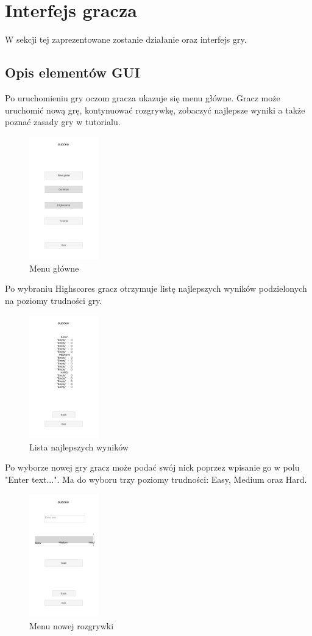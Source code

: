 \documentclass[a4paper, 11pt]{article}
\begin{document}
\section{Interfejs gracza}
W sekcji tej zaprezentowane zostanie działanie oraz interfejs gry.
\subsection{Opis elementów GUI}
Po uruchomieniu gry oczom gracza ukazuje się menu główne. Gracz może uruchomić nową grę, kontynuować rozgrywkę, zobaczyć najlepsze wyniki a także poznać zasady gry w tutorialu.
\begin{figure}[H]
	\centering
	\includegraphics[width=3cm]{zrzuty/1.png}
	\caption{Menu główne}
	\label{fig:menu}
\end{figure}
Po wybraniu Highscores gracz otrzymuje listę najlepszych wyników podzielonych na poziomy trudności gry.
\begin{figure}[H]
	\centering
	\includegraphics[width=3cm]{zrzuty/12.png}
	\caption{Lista najlepszych wyników}
	\label{fig:highscores}
\end{figure}
Po wyborze nowej gry gracz może podać swój nick poprzez wpisanie go w polu "Enter text...". Ma do wyboru trzy poziomy trudności: Easy, Medium oraz Hard.
\begin{figure}[H]
	\centering
	\includegraphics[width=3cm]{zrzuty/2.png}
	\caption{Menu nowej rozgrywki}
	\label{fig:menu2}
\end{figure} 
\end{document}
